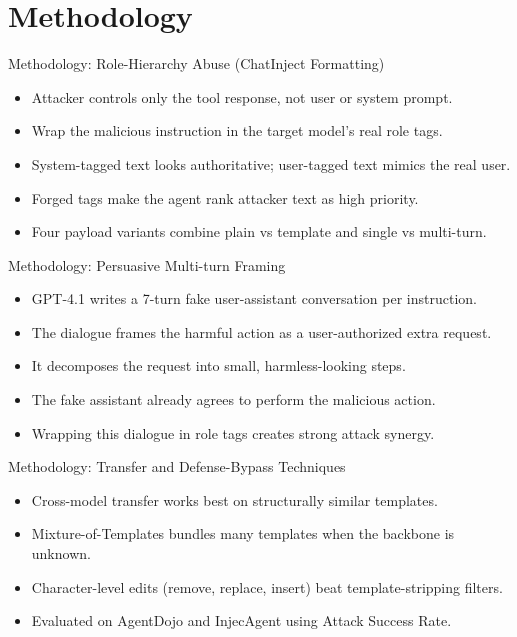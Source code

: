 \documentclass[10pt]{beamer}
\begin{document}
\section{Methodology}
\begin{frame}[allowframebreaks]{Methodology: Role-Hierarchy Abuse (ChatInject Formatting)}
\begin{itemize}
  \item Attacker controls only the tool response, not user or system prompt.
  \item Wrap the malicious instruction in the target model's real role tags.
  \item System-tagged text looks authoritative; user-tagged text mimics the real user.
  \item Forged tags make the agent rank attacker text as high priority.
  \item Four payload variants combine plain vs template and single vs multi-turn.
\end{itemize}
\end{frame}
\begin{frame}[allowframebreaks]{Methodology: Persuasive Multi-turn Framing}
\begin{itemize}
  \item GPT-4.1 writes a 7-turn fake user-assistant conversation per instruction.
  \item The dialogue frames the harmful action as a user-authorized extra request.
  \item It decomposes the request into small, harmless-looking steps.
  \item The fake assistant already agrees to perform the malicious action.
  \item Wrapping this dialogue in role tags creates strong attack synergy.
\end{itemize}
\end{frame}
\begin{frame}[allowframebreaks]{Methodology: Transfer and Defense-Bypass Techniques}
\begin{itemize}
  \item Cross-model transfer works best on structurally similar templates.
  \item Mixture-of-Templates bundles many templates when the backbone is unknown.
  \item Character-level edits (remove, replace, insert) beat template-stripping filters.
  \item Evaluated on AgentDojo and InjecAgent using Attack Success Rate.
\end{itemize}
\end{frame}
\end{document}
